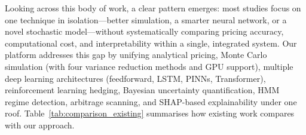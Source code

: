 \documentclass[conference]{IEEEtran}
\begin{document}
Looking across this body of work, a clear pattern emerges: most studies focus on one technique in isolation---better simulation, a smarter neural network, or a novel stochastic model---without systematically comparing pricing accuracy, computational cost, and interpretability within a single, integrated system. Our platform addresses this gap by unifying analytical pricing, Monte Carlo simulation (with four variance reduction methods and GPU support), multiple deep learning architectures (feedforward, LSTM, PINNs, Transformer), reinforcement learning hedging, Bayesian uncertainty quantification, HMM regime detection, arbitrage scanning, and SHAP-based explainability under one roof. Table~\ref{tab:comparison_existing} summarises how existing work compares with our approach.

\begin{table}[htbp]
\caption{Positioning of the Present Study Among Related Work}
\label{tab:comparison_existing}
\centering
\small
\setlength{\tabcolsep}{3pt}
\renewcommand{\arraystretch}{0.95}
\end{table}
\end{document}
